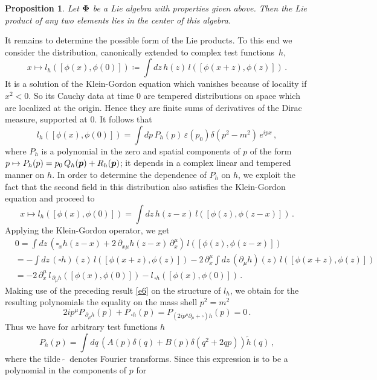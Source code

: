 \documentclass[11pt]{article}
\newtheorem{proposition}[theorem]{Proposition}
\def\bp{\mbox{\boldmath $p$}}
\def\bPhi{\mbox{\boldmath $\Phi$}}
\def\be{\begin{equation}}
\def\ee{\end{equation}}
\begin{document}
\begin{proposition}
  Let $\bPhi$ be a Lie algebra with properties given above. Then
  the Lie product of any two elements lies in the center of this 
  algebra. 
\end{proposition}  
It remains to determine the possible form of the
Lie products. To this
end we consider the distribution,
canonically extended to complex test functions~$h$,   
\be
x \mapsto l_h([\phi(x), \phi(0)]) \coloneqq 
\int \! dz \, h(z) \, l([\phi(x +z),\phi(z)]) \, .
\ee
It is a  solution of the Klein-Gordon equation which vanishes
because of locality if $x^2 < 0$. So its Cauchy data at time $0$ are
tempered distributions on space which are localized
at the origin. Hence they are finite sums of derivatives
of the Dirac measure, supported at $0$. It follows that
\be \label{e6}
l_h([\phi(x), \phi(0)]) = \int \! dp \, P_h(p) \, \varepsilon(p_0)
\delta(p^2 - m^2) \, e^{ipx} \, ,
\ee
where $P_h$ is a polynomial in the zero and spatial components of
$p$ of the form $p \mapsto P_h(p) = p_0 \, Q_h(\bp) + R_h(\bp)$;
it depends in a complex linear and tempered 
manner on $h$. In order to determine
the dependence of $P_h$ on $h$,
we exploit the fact that the second field in
this distribution also satisfies the Klein-Gordon equation
and proceed to 
\be
x \mapsto l_h([\phi(x), \phi(0)]) =
\int \! dz \, h(z-x) \, l([\phi(z),\phi(z - x)]) \, . 
\ee
Applying the Klein-Gordon operator, we get 
\begin{align}
& 0 = \int \! dz \, (\square_x h(z - x) + 2  \, \partial_{x \mu} h(z -x) \,
  \partial_x^\mu) \, l([\phi(z),\phi(z - x)]) \\
  & =  - \int \! dz \,  (\square h)(z) \, l([\phi(x + z),\phi(z)])  
  - 2 \, \partial_x^\mu \int \! dz \, (\partial_\mu h)(z)
  \, l([\phi(x + z),\phi(z)]) \nonumber \\
  & = - 2 \, \partial_x^\mu \, l_{\, \partial_\mu h}([\phi(x), \phi(0)])
  - l_{\, \square h}([\phi(x), \phi(0)]) \, . \nonumber
  \nonumber
\end{align}
Making use of the preceding result \eqref{e6} on the structure of $l_h$, 
we obtain for the resulting polynomials the equality on the mass shell
$p^2 = m^2$
\be
2i p^\mu P_{\, \partial_\mu h}(p) + P_{\, \square h}(p) =
P_{(2i p^\mu \partial_\mu + \square)h}(p) = 0  \, .
\ee
Thus we have for arbitrary test functions $h$
\be
P_h(p) = \int \! dq \, (A(p) \delta(q) + B(p) \delta(q^2 + 2qp))
\widetilde{h}(q) \, ,
\ee
where the tilde $\tilde{ \ \ }$ denotes Fourier transforms.
Since this expression is to be a polynomial in the components of $p$ for
\end{document}
